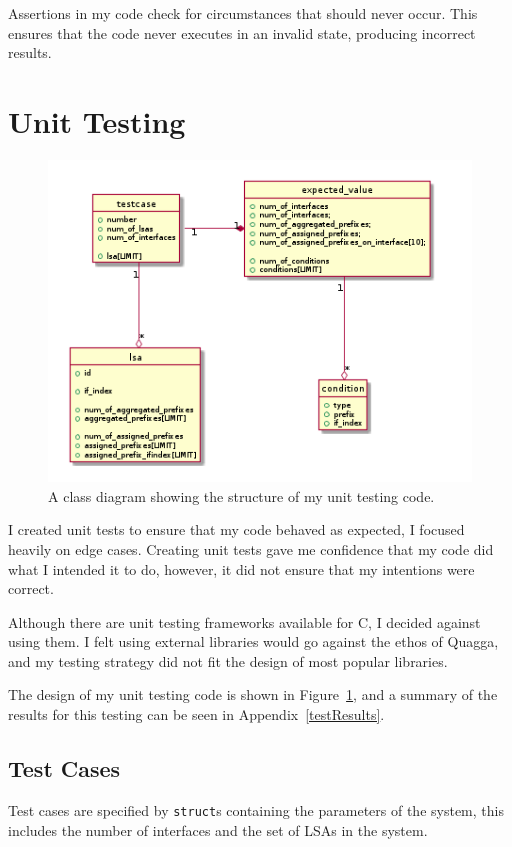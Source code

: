 \documentclass[12pt,a4paper,twoside]{report}
\begin{document}
Assertions in my code check for circumstances that should never occur. This
ensures that the code never executes in an invalid state, producing incorrect
results. 

\section{Unit Testing}
\begin{figure}
\begin{center}
	\includegraphics[width=\linewidth]{../Diagrams/Testing/testcase.png}
	\caption{A class diagram showing the structure of my unit testing code.}
	\label{fig:testcase}
\end{center}
\end{figure}
I created unit tests to ensure that my code behaved as expected, I focused
heavily on edge cases. Creating unit tests gave me confidence that my code did
what I intended it to do, however, it did not ensure that my intentions were
correct.

Although there are unit testing frameworks available for C, I decided against
using them.  I felt using external libraries  would go against the ethos of
Quagga, and my testing strategy did not fit the design of most popular
libraries. 

The design of my unit testing code is shown in Figure~\ref{fig:testcase}, and a
summary of the results for this testing can be seen in
Appendix~\ref{testResults}.

\subsection{Test Cases}
Test cases are specified by \texttt{struct}s containing the parameters of the
system, this includes the number of interfaces and the set of LSAs in the
system. 
\end{document}
